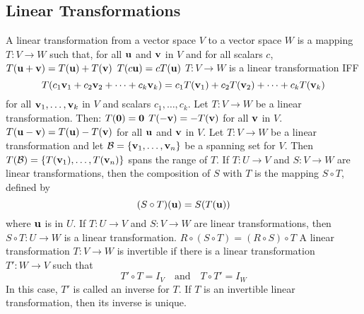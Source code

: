 \documentclass{article}
\begin{document}
    \subsection{Linear Transformations}
    \begin{outline}
        \1 A linear transformation from a vector space $V$ to a vector space $W$ is a mapping \(T:V\to W\) such that, for all \(\vb u\) and \(\vb v\) in $V$ and for all scalars $c$, 
            \2 \(T(\vb u+\vb v)=T(\vb u)+T(\vb v)\)
            \2 \(T(c\vb u)=cT(\vb u)\)
        \1 \(T:V\to W\) is a linear transformation IFF \[T(c_1\vb v_1+c_2\vb v_2+\cdots+c_k\vb v_k)=c_1T(\vb v_1)+c_2T(\vb v_2)+\cdots+c_kT(\vb v_k)\] for all \(\vb v_1,\ldots,\vb v_k\) in $V$ and scalars \(c_1,\ldots,c_k\). 
        \1 Let \(T:V\to W\) be a linear transformation. Then: 
            \2 \(T(\vb 0)=\vb 0\)
            \2 \(T(-\vb v)=-T(\vb v)\) for all \(\vb v\) in $V$. 
            \2 \(T(\vb u-\vb v)=T(\vb u)-T(\vb v)\) for all \(\vb u\) and \(\vb v\) in $V$. 
        \1 Let \(T:V\to W\) be a linear transformation and let \(\mathcal B=\{\vb v_1,\ldots,\vb v_n\}\) be a spanning set for $V$. Then \(T(\mathcal B)=\{T(\vb v_1),\ldots,T(\vb v_n)\}\) spans the range of $T$. 
        \1 If \(T:U\to V\) and \(S:V\to W\) are linear transformations, then the composition of $S$ with $T$ is the mapping \(S\circ T\), defined by \[(S\circ T)(\vb u)=S(T(\vb u))\] where \(\vb u\) is in $U$. 
        \1 If \(T:U\to V\) and \(S:V\to W\) are linear transformations, then \(S\circ T:U\to W\) is a linear transformation. 
        \1 \(R\circ(S\circ T)=(R\circ S)\circ T\)
        \1 A linear transformation \(T:V\to W\) is invertible if there is a linear transformation \(T':W\to V\) such that \[T'\circ T=I_V\quad\text{and}\quad T\circ T'=I_W\] In this case, \(T'\) is called an inverse for $T$. 
        \1 If $T$ is an invertible linear transformation, then its inverse is unique. 
    \end{outline}
\end{document}
